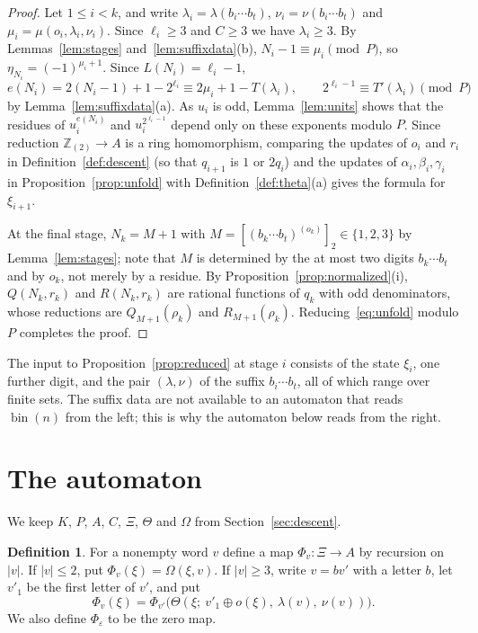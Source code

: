 \documentclass{amsart}
\theoremstyle{definition}
\newtheorem{definition}[theorem]{Definition}
\theoremstyle{remark}
\numberwithin{equation}{section}
\newcommand{\Zt}{\mathbb{Z}_{(2)}}
\newcommand{\val}[1]{[#1]_2}
\newcommand{\bin}{\operatorname{bin}}
\begin{document}
\begin{proof}
Let $1\le i<k$, and write $\lambda_i=\lambda(b_i\cdots b_t)$, $\nu_i=\nu(b_i\cdots b_t)$ and $\mu_i=\mu(o_i,\lambda_i,\nu_i)$. Since $\ell_i\ge3$ and $C\ge3$ we have $\lambda_i\ge3$. By Lemmas~\ref{lem:stages} and~\ref{lem:suffixdata}(b), $N_i-1\equiv\mu_i\pmod P$, so $\eta_{N_i}=(-1)^{\mu_i+1}$. Since $L(N_i)=\ell_i-1$,
\[
e(N_i)=2(N_i-1)+1-2^{\ell_i}\equiv2\mu_i+1-T(\lambda_i),\qquad 2^{\ell_i-1}\equiv T'(\lambda_i)\pmod P
\]
by Lemma~\ref{lem:suffixdata}(a). As $u_i$ is odd, Lemma~\ref{lem:units} shows that the residues of $u_i^{e(N_i)}$ and $u_i^{2^{\ell_i-1}}$ depend only on these exponents modulo $P$. Since reduction $\Zt\to A$ is a ring homomorphism, comparing the updates of $o_i$ and $r_i$ in Definition~\ref{def:descent} (so that $q_{i+1}$ is $1$ or $2q_i$) and the updates of $\alpha_i,\beta_i,\gamma_i$ in Proposition~\ref{prop:unfold} with Definition~\ref{def:theta}(a) gives the formula for $\xi_{i+1}$.

At the final stage, $N_k=M+1$ with $M=\val{(b_k\cdots b_t)^{(o_k)}}\in\{1,2,3\}$ by Lemma~\ref{lem:stages}; note that $M$ is determined by the at most two digits $b_k\cdots b_t$ and by $o_k$, not merely by a residue. By Proposition~\ref{prop:normalized}(i), $Q(N_k,r_k)$ and $R(N_k,r_k)$ are rational functions of $q_k$ with odd denominators, whose reductions are $Q_{M+1}(\rho_k)$ and $R_{M+1}(\rho_k)$. Reducing~\eqref{eq:unfold} modulo $P$ completes the proof.
\end{proof}

The input to Proposition~\ref{prop:reduced} at stage $i$ consists of the state $\xi_i$, one further digit, and the pair $(\lambda,\nu)$ of the suffix $b_i\cdots b_t$, all of which range over finite sets. The suffix data are not available to an automaton that reads $\bin(n)$ from the left; this is why the automaton below reads from the right.

\section{The automaton}\label{sec:automaton}

We keep $K$, $P$, $A$, $C$, $\Xi$, $\Theta$ and $\Omega$ from Section~\ref{sec:descent}.

\begin{definition}\label{def:phi}
For a nonempty word $v$ define a map $\Phi_v\colon\Xi\to A$ by recursion on $|v|$. If $|v|\le2$, put $\Phi_v(\xi)=\Omega(\xi,v)$. If $|v|\ge3$, write $v=bv'$ with a letter $b$, let $v'_1$ be the first letter of $v'$, and put
\[
\Phi_v(\xi)=\Phi_{v'}\bigl(\Theta(\xi;\ v'_1\oplus o(\xi),\ \lambda(v),\ \nu(v))\bigr).
\]
We also define $\Phi_\varepsilon$ to be the zero map.
\end{definition}
\end{document}
